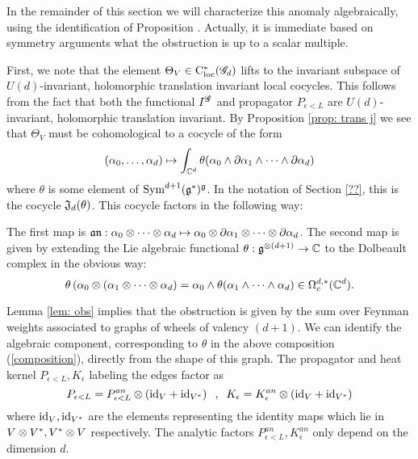 \documentclass[10pt]{amsart}
\begin{document}
In the remainder of this section we will characterize this anomaly algebraically, using the identification of Proposition \cite{prop: trans j}. 
Actually, it is immediate based on symmetry arguments what the obstruction is up to a scalar multiple. 

First, we note that the element $\Theta_V \in {\rm C}_{\rm loc}^*(\mathscr G_d)$ lifts to the invariant subspace of $U(d)$-invariant, holomorphic translation invariant local cocycles.
This follows from the fact that both the functional $I^{\mathscr G}$ and propagator $P_{\epsilon<L}$ are $U(d)$-invariant, holomorphic translation invariant.
By Proposition \ref{prop: trans j} we see that $\Theta_V$ must be cohomological to a cocycle of the form
\[
(\alpha_0, \ldots, \alpha_d) \mapsto \int_{\mathbb C^d} \theta(\alpha_0 \wedge \partial \alpha_1 \wedge \cdots \wedge \partial \alpha_d) 
\]
where $\theta$ is some element of ${\rm Sym}^{d+1}(\mathfrak g^*)^\mathfrak g$.
In the notation of Section \ref{??}, this is the cocycle $\mathfrak J_d (\theta)$. 
This cocycle factors in the following way:
\beqn\label{composition}
\eeqn
The first map is $\mathfrak a \mathfrak n : \alpha_0 \otimes \cdots \otimes \alpha_d \mapsto \alpha_0 \otimes \partial \alpha_1 \otimes \cdots \otimes \partial \alpha_d$.
The second map is given by extending the Lie algebraic functional $\theta : \mathfrak g^{\otimes (d+1)} \to \mathbb C$ to the Dolbeault complex in the obvious way:
\[
\theta \left(\alpha_0 \otimes (\alpha_1 \otimes \cdots \otimes \alpha_d\right) = \alpha_0 \wedge \theta(\alpha_1 \wedge \cdots \wedge \alpha_d) \in \Omega^{d,*}_c(\mathbb C^d).
\]

Lemma \ref{lem: obs} implies that the obstruction is given by the sum over Feynman weights associated to graphs of wheels of valency $(d+1)$.
We can identify the algebraic component, corresponding to $\theta$ in the above composition (\ref{composition}), directly from the shape of this graph. 
The propagator and heat kernel $P_{\epsilon<L}, K_\epsilon$ labeling the edges factor as
\[
P_{\epsilon<L} = P^{an}_{\epsilon<L} \otimes \left({\rm id}_{V} + {\rm id}_{V^*}\right) \;\; , \;\; K_{\epsilon} = K_{\epsilon}^{an} \otimes \left({\rm id}_{V} + {\rm id}_{V^*}\right)
\]
where ${\rm id}_V, {\rm id}_{V^*}$ are the elements representing the identity maps which lie in $V \otimes V^*, V^* \otimes V$ respectively. 
The analytic factors $P^{an}_{\epsilon<L},  K_{\epsilon}^{an}$ only depend on the dimension $d$. 
\end{document}

